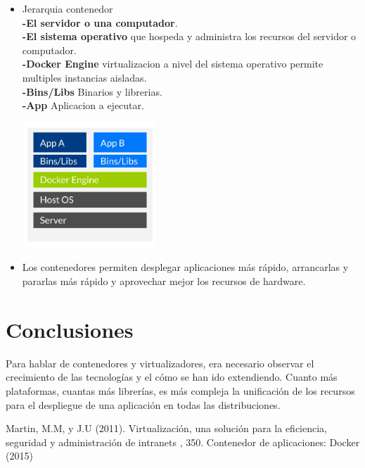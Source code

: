 \documentclass[twoside,twocolumn]{article}
\begin{document}
\begin{itemize}
	\item Jerarquia contenedor
	\\ \textbf{-El servidor o una computador}.
	\\ \textbf{-El sistema operativo} que hospeda y administra los recursos del servidor o computador.
	\\ \textbf{-Docker Engine} virtualizacion a nivel del sistema operativo permite multiples instancias aisladas.
	\\ \textbf{-Bins/Libs} Binarios y librerias.
	\\ \textbf{-App} Aplicacion a ejecutar.
	\begin{center}
	\includegraphics[width=5cm]{./Imagenes/jerarquia2} 
	\end{center}
\end{itemize} 

\begin{itemize}
	\item Los contenedores permiten desplegar aplicaciones más rápido, arrancarlas y pararlas más rápido y aprovechar mejor los recursos de hardware.


\end{itemize} 

\section{Conclusiones}

Para hablar de contenedores y virtualizadores, era necesario observar el crecimiento de las tecnologías y el cómo se han ido extendiendo. Cuanto más plataformas, cuantas más librerías, es más compleja la unificación de los recursos para el despliegue de una aplicación en todas las distribuciones. 

\begin{thebibliography}{99} %

Martin, M.M,  y J.U (2011).
\newblock Virtualización, una solución para la eficiencia,
seguridad y administración de intranets
, 350.
\newblock Contenedor de aplicaciones: Docker (2015)
 
 
\end{thebibliography}

\end{document}
